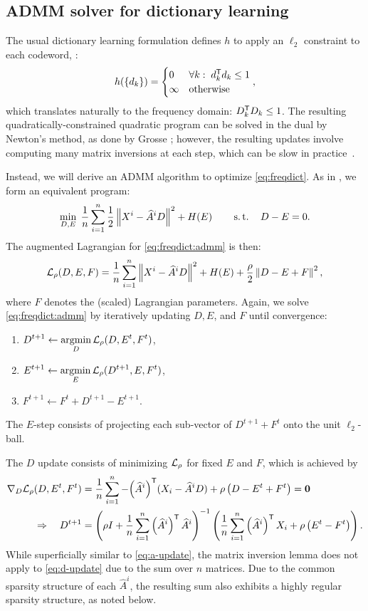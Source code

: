 \documentclass{article} %
\begin{document}
\subsection{ADMM solver for dictionary learning}
The usual dictionary learning formulation defines $h$ to apply an $\ell_2$ constraint to 
each codeword, \ie: 
\[
h(\{d_k\}) = \begin{cases}
0 & \forall k: \; d_k^\mathsf{T} d_k \leq 1\\
\infty & \text{otherwise}
\end{cases},
\]
which translates naturally to
the frequency domain: $D_k^\mathsf{T} D_k \leq 1$.  The resulting quadratically-constrained
quadratic program can be solved in the dual by Newton's method, as done by Grosse
\etal; however, the resulting updates involve computing many matrix 
inversions at each step, which can be slow in practice~\cite[footnote 10]{grosse2007}.

Instead, we will derive an ADMM algorithm to optimize \eqref{eq:freqdict}. As in
, we form an equivalent program:
\begin{equation}
\min_{D,E}\; \frac{1}{n} \sum_{i=1}^n \frac{1}{2} \left\|X^i - \widehat{A}^i D\right\|^2 +
H(E)\quad\quad\operatorname{s.t.}\quad D-E=0.\label{eq:freqdict:admm}
\end{equation}
The augmented Lagrangian for \eqref{eq:freqdict:admm} is then:
\[
\mathcal{L}_\rho(D, E, F) = \frac{1}{n} \sum_{i=1}^n \left\|X^i - \widehat{A}^i D\right\|^2 + H(E) +
\frac{\rho}{2}\left\|D - E + F\right\|^2,
\]
where $F$ denotes the (scaled) Lagrangian parameters.  Again, we solve
\eqref{eq:freqdict:admm} by iteratively updating $D,E$, and $F$ until convergence:
\begin{enumerate}
\item $\displaystyle D^{t+1} \leftarrow \operatorname*{argmin}_D \mathcal{L}_\rho(D, E^t, F^t)$,
\item $\displaystyle E^{t+1} \leftarrow \operatorname*{argmin}_E \mathcal{L}_\rho(D^{t+1}, E, F^t)$,
\item $F^{t+1} \leftarrow F^t + D^{t+1} - E^{t+1}$.
\end{enumerate}
The $E$-step consists of projecting each sub-vector of $D^{t+1} + F^t$ onto the
unit $\ell_2$-ball.  

The $D$ update consists of minimizing $\mathcal{L}_\rho$ for fixed $E$ and $F$, which is
achieved by
\begin{align}
\nabla_D \mathcal{L}_\rho(D, E^t, F^t) &= \frac{1}{n} \sum_{i=1}^n
-{\left(\widehat{A}^i\right)}^\mathsf{T} (X_i - \widehat{A}^i D) + \rho\left(D - E^t +
F^t\right) = \mathbf{0}\notag\\
\Rightarrow \quad D^{t+1} &= {\left(\rho I + \frac{1}{n} \sum_{i=1}^n
\left(\widehat{A}^i\right)^\mathsf{T} \widehat{A}^i \right)}^{-1} 
\left(\frac{1}{n}\sum_{i=1}^n  \left(\widehat{A}^i\right)^\mathsf{T} X_i + \rho\left(E^t -
F^t\right)\right).\label{eq:d-update}
\end{align}
While superficially similar to \eqref{eq:a-update}, the matrix inversion lemma does not
apply to \eqref{eq:d-update} due to the sum over $n$ matrices.  Due to the common
sparsity structure of each $\widehat{A}^i$, the resulting sum also exhibits a highly 
regular sparsity structure, as noted below.
\end{document}
